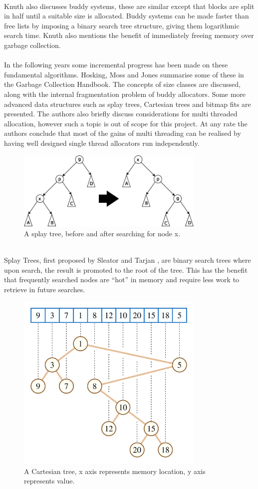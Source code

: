 \documentclass{article}
\begin{document}
\\
Knuth also discusses buddy systems, these are similar except that blocks are split in half until a suitable size is allocated. Buddy systems can be made faster than free lists by imposing a binary search tree structure, giving them logarithmic search time. Knuth also mentions the benefit of immediately freeing memory over garbage collection.\\
\\
In the following years some incremental progress has been made on these fundamental algorithms. Hosking, Moss and Jones \cite{10.5555/2025255} summarise some of these in the Garbage Collection Handbook. The concepts of size classes are discussed, along with the internal fragmentation problem of buddy allocators. Some more advanced data structures such as splay trees, Cartesian trees and bitmap fits are presented. The authors also briefly discuss considerations for multi threaded allocation, however such a topic is out of scope for this project. At any rate the authors conclude that most of the gains of multi threading can be realised by having well designed single thread allocators run independently.\\
\begin{figure}[h]
	\centering
	\includegraphics[width=9cm]{splay_tree}
	\captionsetup{width=10cm}
	\caption{A splay tree, before and after searching for node x.}
\end{figure}
\\
Splay Trees, first proposed by Sleator and Tarjan \cite{10.1145/3828.3835}, are binary search trees where upon search, the result is promoted to the root of the tree. This has the benefit that frequently searched nodes are ``hot'' in memory and require less work to retrieve in future searches. 
\pagebreak
\begin{figure}[h]
	\centering
	\includegraphics[width=9cm]{Cartesian_tree}
	\captionsetup{width=10cm}
	\caption{A Cartesian tree, x axis represents memory location, y axis represents value.}
\end{figure}
\end{document}
